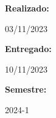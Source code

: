 \documentclass[a4paper]{article}
\begin{document}
\begin{titlepage}
        \raggedright{\huge\textbf{Realizado:}}
        \par\vspace{0.5cm}
        \centering
        {\huge{03/11/2023}}
        \par\vspace{0.5cm}

        \raggedright{\huge\textbf{Entregado:}}
        \par\vspace{0.5cm}
        \centering
        {\huge{10/11/2023}}
        \par\vspace{0.5cm}

        \raggedright{\huge\textbf{Semestre:}}
        \par\vspace{0.5cm}
        \centering
        {\huge{2024-1}}
        \par\vspace{0.5cm}

        \vfill

    \end{titlepage}
    
\end{document}
